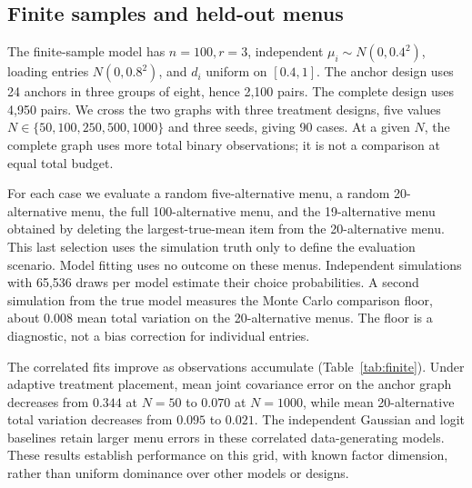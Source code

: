 \documentclass[11pt]{amsart}
\theoremstyle{definition}\newtheorem{example}[theorem]{Example}
\theoremstyle{remark}\newtheorem{remark}[theorem]{Remark}
\begin{document}
\subsection{Finite samples and held-out menus}
The finite-sample model has $n=100,r=3$, independent $\mu_i\sim N(0,0.4^2)$, loading entries $N(0,0.8^2)$, and $d_i$ uniform on $[0.4,1]$. The anchor design uses 24 anchors in three groups of eight, hence 2,100 pairs. The complete design uses 4,950 pairs. We cross the two graphs with three treatment designs, five values $N\in\{50,100,250,500,1000\}$ and three seeds, giving 90 cases. At a given $N$, the complete graph uses more total binary observations; it is not a comparison at equal total budget.

For each case we evaluate a random five-alternative menu, a random 20-alternative menu, the full 100-alternative menu, and the 19-alternative menu obtained by deleting the largest-true-mean item from the 20-alternative menu. This last selection uses the simulation truth only to define the evaluation scenario. Model fitting uses no outcome on these menus. Independent simulations with 65,536 draws per model estimate their choice probabilities. A second simulation from the true model measures the Monte Carlo comparison floor, about $0.008$ mean total variation on the 20-alternative menus. The floor is a diagnostic, not a bias correction for individual entries.

\begin{table}[htbp]\centering\small

\caption{Adaptive treatment design, three-seed means. The covariance column is relative Frobenius error for the joint fit. The next four columns give 20-alternative total variation for the two-stage correlated, joint correlated, independent Gaussian and logit fits. The last column gives the joint fit's 100-alternative total variation.}\label{tab:finite}
\end{table}

The correlated fits improve as observations accumulate (Table~\ref{tab:finite}). Under adaptive treatment placement, mean joint covariance error on the anchor graph decreases from $0.344$ at $N=50$ to $0.070$ at $N=1000$, while mean 20-alternative total variation decreases from $0.095$ to $0.021$. The independent Gaussian and logit baselines retain larger menu errors in these correlated data-generating models. These results establish performance on this grid, with known factor dimension, rather than uniform dominance over other models or designs.
\end{document}
